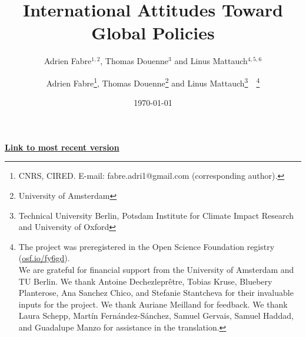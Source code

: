 % 
% 

% 


\title{International Attitudes Toward Global Policies %
} 

\author{Adrien Fabre$^{1,2}$, Thomas Douenne$^3$ and Linus Mattauch$^{4,5,6}$} %
\author{Adrien Fabre\footnote{CNRS, CIRED. E-mail: fabre.adri1@gmail.com (corresponding author).}, Thomas Douenne\footnote{University of Amsterdam}\; and Linus Mattauch\footnote{Technical University Berlin, Potsdam Institute for Climate Impact Research and University of Oxford}~~\thanks{The project %
was preregistered in the Open Science Foundation registry (\href{https://osf.io/fy6gd}{osf.io/fy6gd}). \\ We are grateful for financial support from the University of Amsterdam and TU Berlin. %
We thank Antoine Dechezleprêtre, Tobias Kruse, Bluebery Planterose, Ana Sanchez Chico, and Stefanie Stantcheva for their invaluable inputs for the project. We thank Auriane Meilland for feedback. We thank Laura Schepp, Martín Fernández-Sánchez, Samuel Gervais, Samuel Haddad, and Guadalupe Manzo for assistance in the translation. }} %

\date{\today} %



\maketitle

\begin{center}
{\textbf{\href{https://github.com/bixiou/global_tax_attitudes/raw/main/paper/US1.pdf}{Link to most recent version}}}
\end{center}


